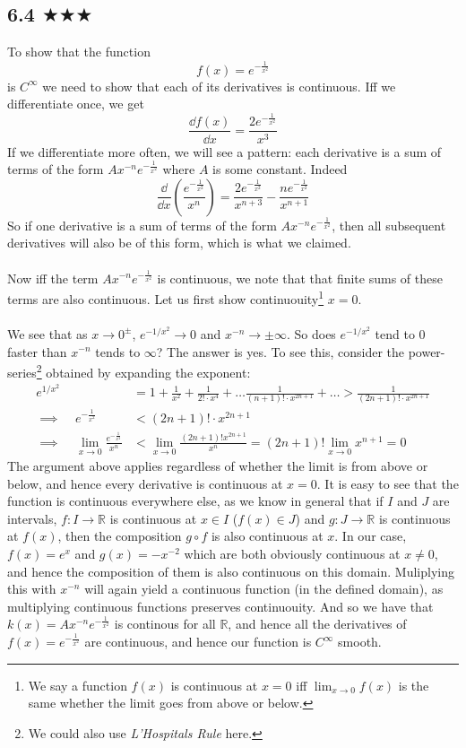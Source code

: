 \subsection{6.4 $\bigstar \bigstar \bigstar$}
To show that the function 
$$f(x)=e^{-\frac{1}{x^2}}$$
is $C^{\infty}$ we need to show that each of its derivatives is continuous. Iff we differentiate once, we get
$$\frac{\dd f(x)}{\dd x}=\frac{2 e^{-\frac{1}{x^2}}}{x^3}$$
If we differentiate more often, we will see a pattern: each derivative is a sum of terms of the form $A x^{-n} e^{-\frac{1}{x^2}}$ where $A$ is some constant. Indeed
$$\frac{\dd }{\dd x}\left(\frac{e^{-\frac{1}{x^2}}}{x^n}\right)=\frac{2 e^{-\frac{1}{x^2}}}{x^{n+3}}-\frac{n e^{-\frac{1}{x^2}}}{x^{n+1}}$$
So if one derivative is a sum of terms of the form $A x^{-n} e^{-\frac{1}{x^2}}$, then all subsequent derivatives will also be of this form, which is what we claimed. \\ \\ Now iff the term $A x^{-n} e^{-\frac{1}{x^2}}$ is continuous, we note that that finite sums of these terms are also continuous. Let us first show continuouity\footnote{We say a function $f(x)$ is continuous at $x=0$ iff $\lim_{x\to 0} f(x)$ is the same whether the limit goes from above or below.} $x=0$. \\ \\ We see that as $x\to 0^\pm$, $e^{-1/x^2}\to 0$ and $x^{-n}\to \pm \infty$. So does $e^{-1/x^2}$ tend to 0 faster than $x^{-n}$ tends to $\infty$? The answer is yes. To see this, consider the power-series\footnote{We could also use \emph{L'Hospitals Rule} here.} obtained by expanding the exponent: 
\begin{align*}
e^{1/x^2}&=1+\frac{1}{x^2}+\frac{1}{2!\cdot x^4 }+\ldots \frac{1}{(n+1)!\cdot x^{2n+1}}+\ldots  > \frac{1}{(2n+1)!\cdot x^{2n+1}}\\
\implies  \ \ \ \ \ e^{-\frac{1}{x^2}}&< (2n+1)!\cdot x^{2n+1}\\
\implies \ \ \ \ \ \lim_{x\to 0}\frac{e^{-\frac{1}{x^2}}}{x^n}&<\lim_{x\to 0} \frac{(2n+1)!x^{2n+1}}{x^n}=(2n+1)!\lim_{x\to 0} x^{n+1}=0
\end{align*}
The argument above applies regardless of whether the limit is from above or below, and hence every derivative is continuous at $x=0$. It is easy to see that the function is continuous everywhere else, as we know in general that if $I$ and $J$ are intervals, $f:I\to\mathbb{R}$ is continuous at $x\in I$ ($f(x)\in J$) and $g: J\to \mathbb{R}$ is continuous at $f(x)$, then the composition $g\circ f$ is also continuous at $x$. In our case, $f(x)=e^x$ and $g(x)=-x^{-2}$ which are both obviously continuous at $x\neq 0$, and hence the composition of them is also continuous on this domain. Muliplying this with $x^{-n}$ will again yield a continuous function (in the defined domain), as multiplying continuous functions preserves continuouity.  And so we have that $k(x)=A x^{-n} e^{-\frac{1}{x^2}}$ is continous for all $\mathbb{R}$, and hence all the derivatives of $f(x)=e^{-\frac{1}{x^2}}$ are continuous, and hence our function is $C^{\infty}$ smooth. 
